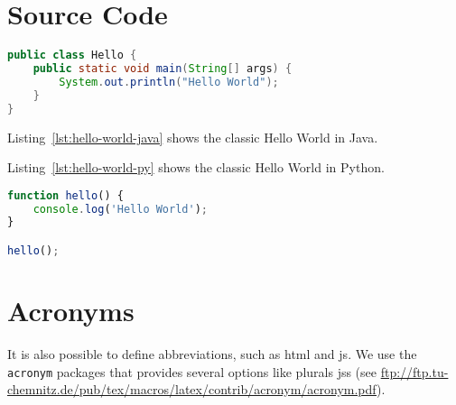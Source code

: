 \section{Source Code}

\begin{lstlisting}[language=Java, caption=Hello World in Java, label=lst:hello-world-java]
public class Hello {
    public static void main(String[] args) {
        System.out.println("Hello World");
    }
}
\end{lstlisting}

Listing~\ref{lst:hello-world-java} shows the classic Hello World in Java.



Listing~\ref{lst:hello-world-py} shows the classic Hello World in Python.

\begin{lstlisting}[language=JavaScript, caption=Hello World in JavaScript, label=lst:hello-world-javascript]
function hello() {
    console.log('Hello World');
}

hello();
\end{lstlisting}

\section{Acronyms}
It is also possible to define abbreviations, such as \ac{html} and \ac{js}. We use the \texttt{acronym} packages that provides several options like plurals \acp{js} (see \url{ftp://ftp.tu-chemnitz.de/pub/tex/macros/latex/contrib/acronym/acronym.pdf}).

